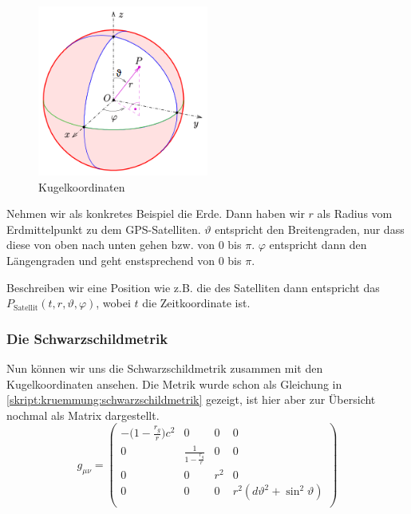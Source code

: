 \begin{refsection}
\begin{figure}[h]
\centering
\includegraphics[width=0.5\textwidth]{gps/pictures/kugelkoordinaten.png}
\caption{Kugelkoordinaten}
\end{figure}

\noindent{}Nehmen wir als konkretes Beispiel die Erde. Dann haben wir $r$ als Radius vom Erdmittelpunkt zu dem GPS-Satelliten. $\vartheta$ entspricht den Breitengraden, nur dass diese von oben nach unten gehen bzw. von 0 bis $\pi$. $\varphi$ entspricht dann den Längengraden und geht enstsprechend von 0 bis $\pi$. 

Beschreiben wir eine Position wie z.B. die des Satelliten dann entspricht das $P_{\text{Satellit}}(t,r,\vartheta,\varphi)$, wobei $t$ die Zeitkoordinate ist.

\subsubsection{Die Schwarzschildmetrik}
Nun können wir uns die Schwarzschildmetrik zusammen mit den Kugelkoordinaten ansehen. Die Metrik wurde schon als Gleichung in \eqref{skript:kruemmung:schwarzschildmetrik} gezeigt, ist hier aber zur Übersicht nochmal als Matrix dargestellt. \\

\begin{equation}
g_{\mu\nu}= 
\begin{pmatrix}
-\biggl(1-\frac{r_g}r\biggr)c^2 & 0 & 0 & 0 \\
0 & \frac1{\displaystyle 1-\frac{r_g}r} & 0 & 0 \\
0 & 0 & r^2 & 0 \\
0 & 0 & 0 & r^2 (d\vartheta^2 + \sin^2\vartheta) \\
\end{pmatrix}
\label{skript:gps:schwarzschildmetrik}
\end{equation} \\


\end{refsection}
